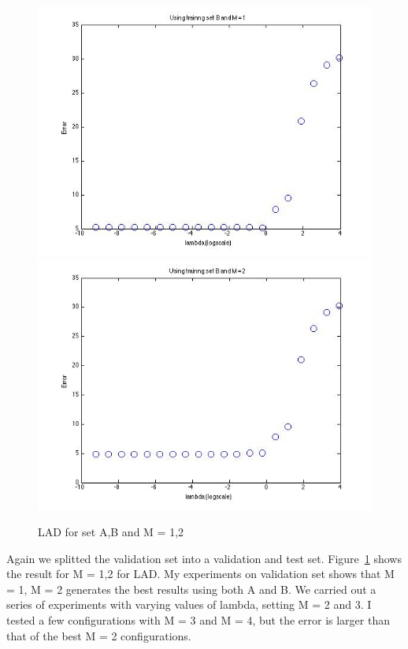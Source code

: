 \begin{figure}[!htb]
                                                                                 \includegraphics[width=\linewidth]{figures/p4_LAD_regressB_m=1}
\endminipage\hfill
{}
  \includegraphics[width=\linewidth]{figures/p4_LAD_regressB_m=2}
\endminipage\hfill
\caption{LAD for set A,B and M = 1,2}\label{p4_LAD}
\end{figure}

Again we splitted the validation set into a validation and test set. Figure~\ref{p4_LAD} shows the result for M = 1,2 for LAD. My experiments on validation set shows that M = 1, M = 2 generates the
best results using both A and B. We carried out a series of experiments with varying values
of lambda, setting M = 2 and 3. I tested a few configurations with M = 3 and M = 4, but the 
error is larger than that of the best M = 2 configurations.  

